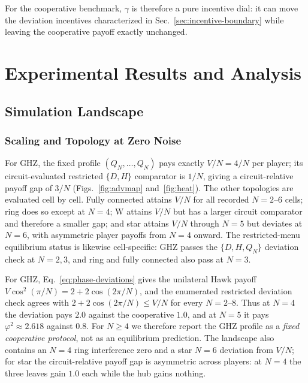 \documentclass[conference,letterpaper,10pt]{IEEEtran}
\begin{document}
For the cooperative benchmark, $\gamma$ is therefore a pure incentive dial: it
can move the deviation incentives characterized in Sec.~\ref{sec:incentive-boundary}
while leaving the cooperative payoff exactly unchanged.





\section{Experimental Results and Analysis}\label{sec:results}

\subsection{Simulation Landscape}\label{sec:sim}

\subsubsection{Scaling and Topology at Zero Noise}
For GHZ, the fixed profile $(Q_N,\dots,Q_N)$ pays exactly $V/N=4/N$ per
player; its circuit-evaluated restricted $\{D,H\}$ comparator is $1/N$, giving
a circuit-relative payoff gap of $3/N$ (Figs.~\ref{fig:advmap}
and~\ref{fig:heat}). The other
topologies are evaluated cell by cell. Fully connected attains $V/N$ for all
recorded $N=2$--$6$ cells; ring does so except at $N=4$; W attains $V/N$ but
has a larger circuit comparator and therefore a smaller gap; and star attains
$V/N$ through $N=5$ but deviates at $N=6$, with asymmetric player payoffs
from $N=4$ onward. The restricted-menu equilibrium status is likewise
cell-specific: GHZ passes the $\{D,H,Q_N\}$ deviation check at $N=2,3$, and
ring and fully connected also pass at $N=3$.

For GHZ, Eq.~\eqref{eq:phase-deviations} gives the unilateral Hawk payoff
$V\cos^2(\pi/N)=2+2\cos(2\pi/N)$, and the enumerated restricted deviation
check agrees with $2+2\cos(2\pi/N)\le V/N$ for every $N=2$--$8$. Thus at $N=4$ the deviation
pays $2.0$ against the cooperative $1.0$, and at $N=5$ it pays
$\varphi^2\approx2.618$ against $0.8$. For $N\ge4$ we therefore report the GHZ
profile as a \emph{fixed cooperative protocol}, not as an equilibrium
prediction. The landscape also contains an $N=4$ ring interference zero and
a star $N=6$ deviation from $V/N$; for star the circuit-relative payoff gap
is asymmetric across players: at $N=4$ the three leaves gain $1.0$ each
while the hub gains nothing.
\end{document}
